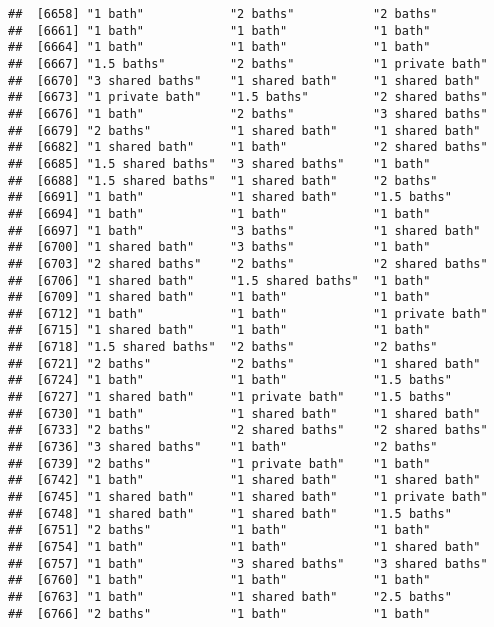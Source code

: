 \documentclass[
]{article}
\begin{document}
\begin{verbatim}
##  [6658] "1 bath"            "2 baths"           "2 baths"          
##  [6661] "1 bath"            "1 bath"            "1 bath"           
##  [6664] "1 bath"            "1 bath"            "1 bath"           
##  [6667] "1.5 baths"         "2 baths"           "1 private bath"   
##  [6670] "3 shared baths"    "1 shared bath"     "1 shared bath"    
##  [6673] "1 private bath"    "1.5 baths"         "2 shared baths"   
##  [6676] "1 bath"            "2 baths"           "3 shared baths"   
##  [6679] "2 baths"           "1 shared bath"     "1 shared bath"    
##  [6682] "1 shared bath"     "1 bath"            "2 shared baths"   
##  [6685] "1.5 shared baths"  "3 shared baths"    "1 bath"           
##  [6688] "1.5 shared baths"  "1 shared bath"     "2 baths"          
##  [6691] "1 bath"            "1 shared bath"     "1.5 baths"        
##  [6694] "1 bath"            "1 bath"            "1 bath"           
##  [6697] "1 bath"            "3 baths"           "1 shared bath"    
##  [6700] "1 shared bath"     "3 baths"           "1 bath"           
##  [6703] "2 shared baths"    "2 baths"           "2 shared baths"   
##  [6706] "1 shared bath"     "1.5 shared baths"  "1 bath"           
##  [6709] "1 shared bath"     "1 bath"            "1 bath"           
##  [6712] "1 bath"            "1 bath"            "1 private bath"   
##  [6715] "1 shared bath"     "1 bath"            "1 bath"           
##  [6718] "1.5 shared baths"  "2 baths"           "2 baths"          
##  [6721] "2 baths"           "2 baths"           "1 shared bath"    
##  [6724] "1 bath"            "1 bath"            "1.5 baths"        
##  [6727] "1 shared bath"     "1 private bath"    "1.5 baths"        
##  [6730] "1 bath"            "1 shared bath"     "1 shared bath"    
##  [6733] "2 baths"           "2 shared baths"    "2 shared baths"   
##  [6736] "3 shared baths"    "1 bath"            "2 baths"          
##  [6739] "2 baths"           "1 private bath"    "1 bath"           
##  [6742] "1 bath"            "1 shared bath"     "1 shared bath"    
##  [6745] "1 shared bath"     "1 shared bath"     "1 private bath"   
##  [6748] "1 shared bath"     "1 shared bath"     "1.5 baths"        
##  [6751] "2 baths"           "1 bath"            "1 bath"           
##  [6754] "1 bath"            "1 bath"            "1 shared bath"    
##  [6757] "1 bath"            "3 shared baths"    "3 shared baths"   
##  [6760] "1 bath"            "1 bath"            "1 bath"           
##  [6763] "1 bath"            "1 shared bath"     "2.5 baths"        
##  [6766] "2 baths"           "1 bath"            "1 bath"           

\end{verbatim}
\end{document}
